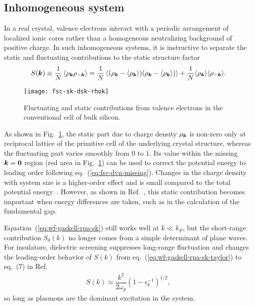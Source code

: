 \subsection{Inhomogeneous system}
In a real crystal, valence electrons interact with a periodic arrangement of localized ionic cores rather than a homogeneous neutralizing background of positive charge.
In such inhomogeneous systems, it is instructive to separate the static and fluctuating contributions to the static structure factor
\begin{align}
S(\boldsymbol{k}) \equiv \frac{1}{N}\left\langle
\rho_{\boldsymbol{k}}\rho_{-\boldsymbol{k}}
\right\rangle =
\frac{1}{N}\left\langle
(\rho_{\boldsymbol{k}}-\langle\rho_{\boldsymbol{k}}\rangle)(\rho_{\boldsymbol{k}}-\langle\rho_{\boldsymbol{k}}\rangle)
\right\rangle + \frac{1}{N}
\langle\rho_{\boldsymbol{k}}\rangle\langle\rho_{-\boldsymbol{k}}\rangle.
\end{align}
\begin{figure}[h]
\texttt{[image: fsc-sk-dsk-rhok]}
\caption{Fluctuating and static contributions from valence electrons in the conventional cell of bulk silicon.}
\label{fig:fsc-sk-dsk-rhok}
\end{figure}
As shown in Fig.~\ref{fig:fsc-sk-dsk-rhok}, the static part due to charge density $\rho_{\boldsymbol{k}}$ is non-zero only at reciprocal lattice of the primitive cell of the underlying crystal structure, whereas the fluctuating part varies smoothly from $0$ to $1$. Its value within the missing $\boldsymbol{k}=\boldsymbol{0}$ region (red area in Fig.~\ref{fig:fsc-sk-dsk-rhok}) can be used to correct the potential energy to leading order following eq.~(\ref{eq:fsc-dvn-missing}).
Changes in the charge density with system size is a higher-order effect and is small compared to the total potential energy~\cite{Clay2016}. However, as shown in Ref.~\cite{Yang2020-gap}, this static contribution becomes important when energy differences are taken, such as in the calculation of the fundamental gap.

Equation~(\ref{eq:wf-gaskell-rpa-sk}) still works well at $k\ll k_F$, but the short-range contribution $S_0(k)$ no longer comes from a simple determinant of plane waves. For insulators, dielectric screening suppresses long-range fluctuation and changes the leading-order behavior of $S(k)$ from eq.~(\ref{eq:wf-gaskell-rpa-sk-taylor}) to eq.~(7) in Ref.~\cite{Yang2020-gap}
\begin{align}
S(k) \approx \dfrac{k^2}{2\omega_p}(1-\epsilon_k^{-1})^{1/2},
\end{align}
so long as plasmons are the dominant excitation in the system.

